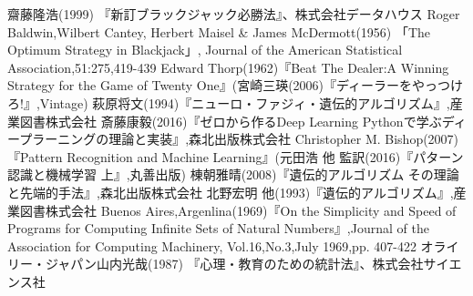 \begin{thebibliography}{10}
   齋藤隆浩(1999) 『新訂ブラックジャック必勝法』、株式会社データハウス
   Roger Baldwin,Wilbert Cantey, Herbert Maisel \& James McDermott(1956) 「The Optimum Strategy in Blackjack」, Journal of the American Statistical Association,51:275,419-439
  Edward Thorp(1962)『Beat The Dealer:A Winning Strategy for the Game of Twenty One』(宮崎三瑛(2006)『ディーラーをやっつけろ!』,Vintage)
   萩原将文(1994)『ニューロ・ファジィ・遺伝的アルゴリズム』,産業図書株式会社
   斎藤康毅(2016)『ゼロから作るDeep Learning Pythonで学ぶディープラーニングの理論と実装』,森北出版株式会社
   Christopher M. Bishop(2007)『Pattern Recognition and Machine Learning』(元田浩 他 監訳(2016)『パターン認識と機械学習 上』,丸善出版)
   棟朝雅晴(2008)『遺伝的アルゴリズム その理論と先端的手法』,森北出版株式会社
   北野宏明 他(1993)『遺伝的アルゴリズム』,産業図書株式会社
   Buenos Aires,Argenlina(1969)『On the Simplicity and Speed of Programs for Computing Infinite Sets of Natural Numbers』,Journal of the Association for Computing Machinery, Vol.16,No.3,July 1969,pp. 407-422
   オライリー・ジャパン山内光哉(1987) 『心理・教育のための統計法』、株式会社サイエンス社
\end{thebibliography}